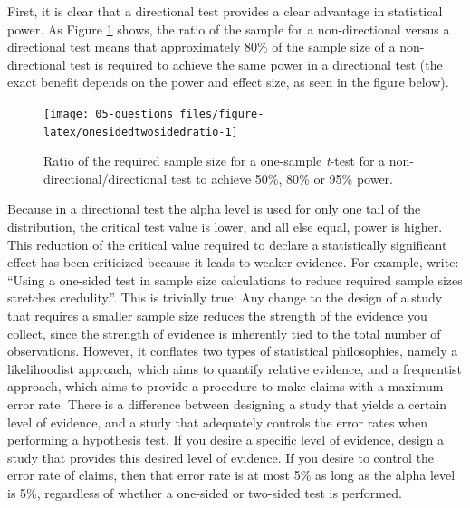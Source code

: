 \documentclass[
  oneside]{krantz}
\begin{document}
First, it is clear that a directional test provides a clear advantage in statistical power. As Figure \ref{fig:onesidedtwosidedratio} shows, the ratio of the sample for a non-directional versus a directional test means that approximately 80\% of the sample size of a non-directional test is required to achieve the same power in a directional test (the exact benefit depends on the power and effect size, as seen in the figure below).



\begin{figure}

{\centering \texttt{[image: 05-questions\_files/figure-latex/onesidedtwosidedratio-1]} 

}

\caption{Ratio of the required sample size for a one-sample \emph{t}-test for a non-directional/directional test to achieve 50\%, 80\% or 95\% power.}\label{fig:onesidedtwosidedratio}
\end{figure}

Because in a directional test the alpha level is used for only one tail of the distribution, the critical test value is lower, and all else equal, power is higher. This reduction of the critical value required to declare a statistically significant effect has been criticized because it leads to weaker evidence. For example, \citet{schulz_sample_2005} write: ``Using a one-sided test in sample size calculations to reduce required sample sizes stretches credulity.''. This is trivially true: Any change to the design of a study that requires a smaller sample size reduces the strength of the evidence you collect, since the strength of evidence is inherently tied to the total number of observations. However, it conflates two types of statistical philosophies, namely a likelihoodist approach, which aims to quantify relative evidence, and a frequentist approach, which aims to provide a procedure to make claims with a maximum error rate. There is a difference between designing a study that yields a certain level of evidence, and a study that adequately controls the error rates when performing a hypothesis test. If you desire a specific level of evidence, design a study that provides this desired level of evidence. If you desire to control the error rate of claims, then that error rate is at most 5\% as long as the alpha level is 5\%, regardless of whether a one-sided or two-sided test is performed.
\end{document}
